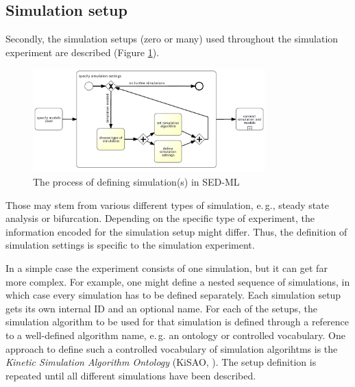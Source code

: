 \subsection{Simulation setup}
\label{overview:simulation}
Secondly, the simulation setups (zero or many) used throughout the simulation experiment are described (Figure \ref{fig:workflowSimulation}). 
%
%
\begin{figure}[h]
\centering
\includegraphics[width=0.8\textwidth]{images/bpmn/sedSimulationOryx.png}
\caption{The process of defining simulation(s) in SED-ML}
\label{fig:workflowSimulation}
\end{figure}
%
Those may stem from various different types of simulation, e.\,g., steady state analysis or bifurcation.  Depending on the specific type of experiment, the information encoded for the simulation setup might differ. Thus, the definition of simulation settings is specific to the simulation experiment.

In a simple case the experiment consists of one simulation, but it can get far more complex. For example, one might define a nested sequence of simulations, in which case every simulation has to be defined separately.
Each simulation setup gets its own internal ID and an optional name. For each of the setups, the simulation algorithm to be used for that simulation is defined through a reference to a well-defined algorithm name, e.\,g. an ontology or controlled vocabulary. One approach to define such a controlled vocabulary of simulation algorihtms is the \emph{Kinetic Simulation Algorithm Ontology} (KiSAO, \cite{CWK+10}). 
%
The setup definition is repeated until all different simulations have been described.

